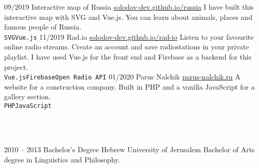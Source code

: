 \documentclass[9pt]{developercv} %
\begin{document}
\begin{entrylist}
  \entry
    {09/2019}
    {Interactive map of Russia}
    {\href{https://solodov-dev.github.io/russia}{solodov-dev.github.io/russia}}
    {I have built this interactive map with SVG and Vue.js. You can learn about animals, places and famous people of Russia.\\ \texttt{SVG}\slashsep\texttt{Vue.js}}
 \entry
    {11/2019}
    {Rad.io}
    {\href{https://solodov-dev.github.io/rad-io}{solodov-dev.github.io/rad-io}}
    {Listen to your favourite online radio streams. Create an account and save radiostations in your private playlist. I have used Vue.js for the front end and Firebase as a backend for this project.\\ \texttt{Vue.js}\slashsep\texttt{Firebase}\slashsep\texttt{Open Radio API}}
  \entry
    {01/2020}
    {Parus Nalchik}
    {\href{https://parus-nalchik.ru}{parus-nalchik.ru}}
    {A website for a construction company. Built in PHP and a vanilla JavaScript for a gallery section.\\ \texttt{PHP}\slashsep\texttt{JavaScript}}

\end{entrylist}
\\~\\


\begin{entrylist}
  \entry
      {2010 -- 2013}
      {Bachelor's Degree}
      {Hebrew University of Jerusalem}
      {Bachelor of Arts degree in Linguistics and Philosophy.}
\end{entrylist}
\\~\\

\end{document}
